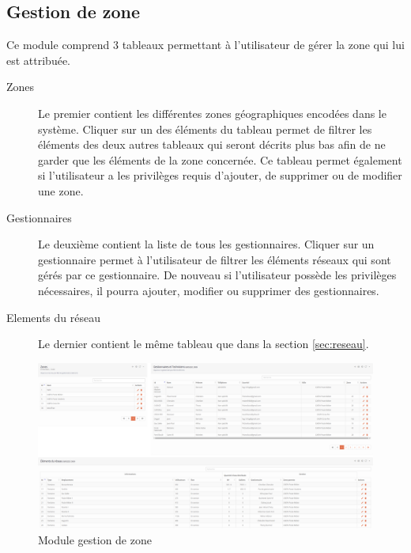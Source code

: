 \documentclass{EPL-master-thesis-covers-FR}
\begin{document}
			\subsection{Gestion de zone}
				Ce module comprend 3 tableaux permettant à l'utilisateur de gérer la zone qui lui est attribuée.
				\begin{description}
					\item[Zones] Le premier contient les différentes zones géographiques encodées dans le système. Cliquer sur un des éléments du tableau permet de filtrer les éléments des deux autres tableaux qui seront décrits plus bas afin de ne garder que les éléments de la zone concernée. Ce tableau permet également si l'utilisateur a les privilèges requis d'ajouter, de supprimer ou de modifier une zone.
					\item[Gestionnaires] Le deuxième contient la liste de tous les gestionnaires. Cliquer sur un gestionnaire permet à l'utilisateur de filtrer les éléments réseaux qui sont gérés par ce gestionnaire. De nouveau si l'utilisateur possède les privilèges nécessaires, il pourra ajouter, modifier ou supprimer des gestionnaires.
					\item [Elements du réseau] Le dernier contient le même tableau que dans la section \ref{sec:reseau}.
				\end{description}
				\begin{figure}[H]
					\centering
					\includegraphics[width=1\textwidth]{images/gestion}
					\caption{Module gestion de zone}
				\end{figure}
			
\end{document}
